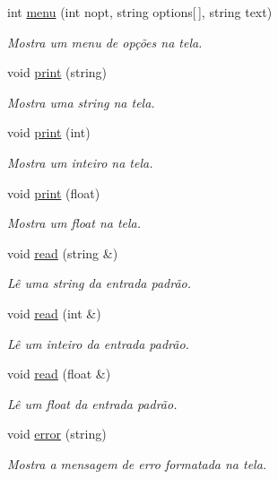 \begin{DoxyCompactItemize}
\item 
int \hyperlink{classTextual_a8b74c4f42ad3e8109ade0f12db4ccf3a}{menu} (int nopt, string options\mbox{[}$\,$\mbox{]}, string text)
\begin{DoxyCompactList}\small\item\em Mostra um menu de opções na tela. \end{DoxyCompactList}\item 
void \hyperlink{classTextual_a79264d4c405089034447a553cd3859e5}{print} (string)
\begin{DoxyCompactList}\small\item\em Mostra uma string na tela. \end{DoxyCompactList}\item 
void \hyperlink{classTextual_aab79476a2e99375655df0bc3d8738536}{print} (int)
\begin{DoxyCompactList}\small\item\em Mostra um inteiro na tela. \end{DoxyCompactList}\item 
void \hyperlink{classTextual_a5558fc2f9db356453e60dbe6fc0e5dba}{print} (float)
\begin{DoxyCompactList}\small\item\em Mostra um float na tela. \end{DoxyCompactList}\item 
void \hyperlink{classTextual_a5998864514acbf61ca8d6fa1845d0d22}{read} (string \&)
\begin{DoxyCompactList}\small\item\em Lê uma string da entrada padrão. \end{DoxyCompactList}\item 
void \hyperlink{classTextual_a888e02776648906696eeaea0e8691cd6}{read} (int \&)
\begin{DoxyCompactList}\small\item\em Lê um inteiro da entrada padrão. \end{DoxyCompactList}\item 
void \hyperlink{classTextual_a2758b8a95187575114d49a528624b79d}{read} (float \&)
\begin{DoxyCompactList}\small\item\em Lê um float da entrada padrão. \end{DoxyCompactList}\item 
void \hyperlink{classTextual_a42ebc971370c4de20314ee33cd863cb3}{error} (string)
\begin{DoxyCompactList}\small\item\em Mostra a mensagem de erro formatada na tela. \end{DoxyCompactList}\item 

\end{DoxyCompactItemize}
